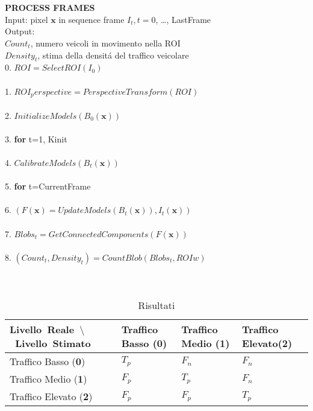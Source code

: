 \documentclass[10pt]{llncs}
\begin{document}
\\
\\
{\bf PROCESS FRAMES}\\[.4cm]
{\sf
Input: pixel $\textbf{x}$ in sequence frame $I_t, t=0$, \ldots, LastFrame\\
Output:\\ 
$Count_t$, numero veicoli in movimento nella ROI\\[.2cm]
$Density_t$, stima della densit\'a del traffico veicolare \\[.2cm]
0. $ ROI=SelectROI(I_0)$ \\
\\
1. $ ROI_perspective= PerspectiveTransform(ROI) $ \\
\\
2. $InitializeModels(B_0(\textbf{x}))$\\
\\
3. {\bf for} t=1, Kinit\\
\\
4. \hspace*{0.2cm}  $CalibrateModels(B_t(\textbf{x}))$\\
\\
5. {\bf for} t=CurrentFrame\\
\\
6. \hspace*{0.2cm} {\em $(F(\textbf{x}) =
UpdateModels(B_t(\textbf{x})), I_t(\textbf{x}))$}\\%
\\
7. \hspace*{0.2cm} 
{$Blobs_t=GetConnectedComponents(F(\textbf{x}))$} \\
\\
8. \hspace*{0.2cm}
$ (Count_t,Density_t)= CountBlob(Blobs_t,ROIw)$
}\\[.4cm]
\\
\\


\begin{table}[htbp]
\begin{center}
\begin{tabular}{| l | l | l | l |}
\hline
\mbox{Livello Reale $\setminus$ Livello Stimato} & Traffico Basso (\textbf{0})  & Traffico Medio (\textbf{1}) & Traffico Elevato(\textbf{2}) \\
\hline
Traffico Basso (\textbf{0})     &  $T_p$ &  $F_n$ &  $F_n$\\
\hline
Traffico Medio (\textbf{1})   &  $F_p$ &  $T_p$ &  $F_n$\\
\hline
Traffico Elevato (\textbf{2}) &  $F_p$ &  $F_p$ &  $T_p$ \\
\hline
\end{tabular}
\end{center}
\caption{Risultati} 
\label{tab:tableMatriceConfusione}
\end{table}
\end{document}
